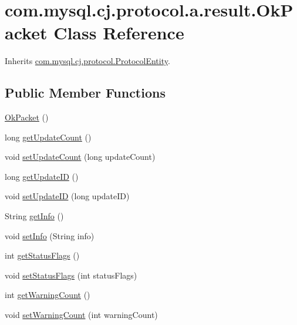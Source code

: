 \hypertarget{classcom_1_1mysql_1_1cj_1_1protocol_1_1a_1_1result_1_1_ok_packet}{}\section{com.\+mysql.\+cj.\+protocol.\+a.\+result.\+Ok\+Packet Class Reference}
\label{classcom_1_1mysql_1_1cj_1_1protocol_1_1a_1_1result_1_1_ok_packet}


Inherits \mbox{\hyperlink{interfacecom_1_1mysql_1_1cj_1_1protocol_1_1_protocol_entity}{com.\+mysql.\+cj.\+protocol.\+Protocol\+Entity}}.

\subsection*{Public Member Functions}
\begin{DoxyCompactItemize}
\item 
\mbox{\hyperlink{classcom_1_1mysql_1_1cj_1_1protocol_1_1a_1_1result_1_1_ok_packet_a1e54c51e2e444f8f54af2d7395d97d35}{Ok\+Packet}} ()
\item 
long \mbox{\hyperlink{classcom_1_1mysql_1_1cj_1_1protocol_1_1a_1_1result_1_1_ok_packet_af68498f55babf2ab07420135746da05e}{get\+Update\+Count}} ()
\item 
void \mbox{\hyperlink{classcom_1_1mysql_1_1cj_1_1protocol_1_1a_1_1result_1_1_ok_packet_a5f719d9ad11188812ae4f0cd66c7ba0f}{set\+Update\+Count}} (long update\+Count)
\item 
long \mbox{\hyperlink{classcom_1_1mysql_1_1cj_1_1protocol_1_1a_1_1result_1_1_ok_packet_ae1c430472a6a22fde1a1163a648f577f}{get\+Update\+ID}} ()
\item 
void \mbox{\hyperlink{classcom_1_1mysql_1_1cj_1_1protocol_1_1a_1_1result_1_1_ok_packet_aa9559c0507db9aac807d5117c236d1ea}{set\+Update\+ID}} (long update\+ID)
\item 
String \mbox{\hyperlink{classcom_1_1mysql_1_1cj_1_1protocol_1_1a_1_1result_1_1_ok_packet_a759aeb235b7bbec4ff1453fdc2a91c12}{get\+Info}} ()
\item 
void \mbox{\hyperlink{classcom_1_1mysql_1_1cj_1_1protocol_1_1a_1_1result_1_1_ok_packet_ab78014f637309b3a6240ccd25d93f4f4}{set\+Info}} (String info)
\item 
int \mbox{\hyperlink{classcom_1_1mysql_1_1cj_1_1protocol_1_1a_1_1result_1_1_ok_packet_ade1d58ca1f54f750534c9fbbe9ed221b}{get\+Status\+Flags}} ()
\item 
void \mbox{\hyperlink{classcom_1_1mysql_1_1cj_1_1protocol_1_1a_1_1result_1_1_ok_packet_a81a86839602aee414c62e19aa7dd9e76}{set\+Status\+Flags}} (int status\+Flags)
\item 
int \mbox{\hyperlink{classcom_1_1mysql_1_1cj_1_1protocol_1_1a_1_1result_1_1_ok_packet_a60c7d0b2521573ce243127dd8000d820}{get\+Warning\+Count}} ()
\item 
void \mbox{\hyperlink{classcom_1_1mysql_1_1cj_1_1protocol_1_1a_1_1result_1_1_ok_packet_a43a155758a5d03fbf93e8e7f753526a0}{set\+Warning\+Count}} (int warning\+Count)
\end{DoxyCompactItemize}
